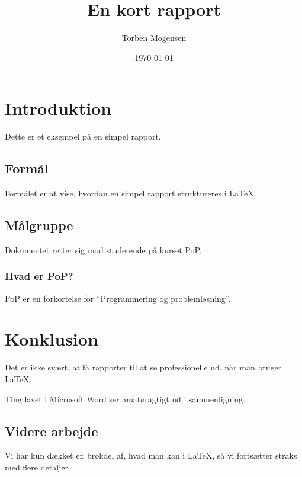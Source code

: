 \documentclass{report}
\begin{document}
\title{En kort rapport}

\author{Torben Mogensen}
\date{\today}

\maketitle

\chapter{Introduktion}

Dette er et eksempel på en simpel rapport.

\section{Formål}

Formålet er at vise, hvordan en simpel rapport struktureres i \LaTeX.

\section{Målgruppe}

Dokumentet retter sig mod studerende på kurset PoP.

\subsection{Hvad er PoP?}

PoP er en forkortelse for ``Programmering og problemløsning''.

\chapter{Konklusion}

Det er ikke svært, at få rapporter til at se professionelle ud, når
man bruger \LaTeX.

Ting lavet i Microsoft Word ser amatøragtigt ud i sammenligning.

\section{Videre arbejde}

Vi har kun dækket en brøkdel af, hvad man kan i \LaTeX, så vi
fortsætter straks med flere detaljer.
\end{document}
